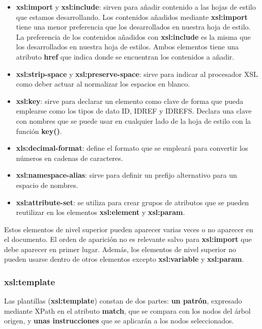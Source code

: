 \begin{itemize}
    \item \textbf{xsl:import} y \textbf{xsl:include}: sirven para añadir contenido a las hojas de estilo que estamos desarrollando. Los contenidos añadidos mediante \textbf{xsl:import} tiene una menor preferencia que los desarrollados en nuestra hoja de estilo. La preferencia de los contenidos añadidos con \textbf{xsl:include} es la misma que los desarrollados en nuestra hoja de estilos. Ambos elementos tiene una atributo \textbf{href} que indica donde se encuentran los contenidos a añadir.

    \item \textbf{xsl:strip-space} y \textbf{xsl:preserve-space}: sirve para indicar al procesador XSL como deber actuar al normalizar los espacios en blanco.

    \item \textbf{xsl:key}: sirve para declarar un elemento como clave de forma que pueda emplearse como los tipos de dato ID, IDREF y IDREFS. Declara una clave con nombres que se puede usar en cualquier lado de la hoja de estilo con la función \textbf{key()}.

    \item \textbf{xls:decimal-format}: define el formato que se empleará para convertir los números en cadenas de caracteres.

    \item \textbf{xsl:namespace-alias}: sirve para definir un prefijo alternativo para un espacio de nombres.

    \item \textbf{xsl:attribute-set}: se utiliza para crear grupos de atributos que se pueden reutilizar en los elementos \textbf{xsl:element} y \textbf{xsl:param}.
\end{itemize}

Estos elementos de nivel superior pueden aparecer varias veces o no aparecer en el documento. El orden de aparición no es relevante salvo para \textbf{xsl:import} que debe aparecer en primer lugar. Además, los elementos de nivel superior no pueden usarse dentro de otros elementos excepto \textbf{xsl:variable} y \textbf{xsl:param}.

\subsubsection{xsl:template}
Las plantillas (\textbf{xsl:template}) constan de dos partes: \textbf{un patrón}, expresado mediante XPath en el atributo \textbf{match}, que se compara con los nodos del árbol origen, y \textbf{unas instrucciones} que se aplicarán a los nodos seleccionados.

